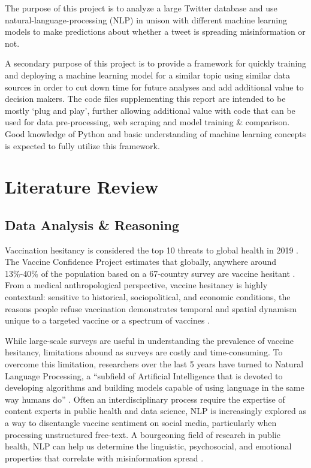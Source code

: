 \documentclass[12pt]{article}
\begin{document}
The purpose of this project is to analyze a large Twitter database and use natural-language-processing (NLP) in unison with different machine learning models to make predictions about whether a tweet is spreading misinformation or not. 

A secondary purpose of this project is to provide a framework for quickly training and deploying a machine learning model for a similar topic using similar data sources in order to cut down time for future analyses and add additional value to decision makers. The code files supplementing this report are intended to be mostly ‘plug and play’, further allowing additional value with code that can be used for data pre-processing, web scraping and model training \& comparison. Good knowledge of Python and basic understanding of machine learning concepts is expected to fully utilize this framework.  



\section{Literature Review}
\subsection{Data Analysis \& Reasoning}
Vaccination hesitancy is considered the top 10 threats to global health in 2019 \cite{WHO-top10-2019}. The Vaccine Confidence Project estimates that globally, anywhere around 13\%-40\% of the population based on a 67-country survey are vaccine hesitant \cite{larson-2016}. From a medical anthropological perspective, vaccine hesitancy is highly contextual: sensitive to historical, sociopolitical, and economic conditions, the reasons people refuse vaccination demonstrates temporal and spatial dynamism unique to a targeted vaccine or a spectrum of vaccines \cite{dube-gagnon-2014, dube-vivion-2015}.  

While large-scale surveys are useful in understanding the prevalence of vaccine hesitancy, limitations abound as surveys are costly and time-consuming. To overcome this limitation, researchers over the last 5 years have turned to Natural Language Processing, a “subfield of Artificial Intelligence that is devoted to developing algorithms and building models capable of using language in the same way humans do” \cite{balic-2020}. Often an interdisciplinary process require the expertise of content experts in public health and data science, NLP is increasingly explored as a way to disentangle vaccine sentiment on social media, particularly when processing unstructured free-text. A bourgeoning field of research in public health, NLP can help us determine the linguistic, psychosocial, and emotional properties that correlate with misinformation spread \cite{monsted-2019}.
\end{document}
